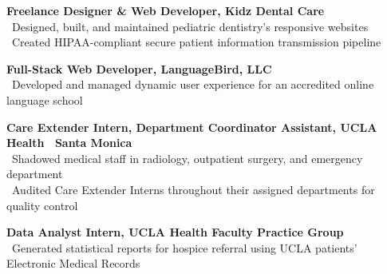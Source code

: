 \textbf{Freelance Designer \& Web Developer, Kidz Dental Care}\\
\textendash\ Designed, built, and maintained pediatric dentistry's responsive websites\\
\textendash\ Created HIPAA-compliant secure patient information transmission pipeline

\pubspace

\textbf{Full-Stack Web Developer, LanguageBird\textsuperscript{\textregistered}, LLC}\\
\textendash\ Developed and managed dynamic user experience for an accredited online language school

\pubspace

\textbf{Care Extender Intern, Department Coordinator Assistant, UCLA Health \textendash\ Santa Monica}\\
\textendash\ Shadowed medical staff in radiology, outpatient surgery, and emergency department\\
\textendash\ Audited Care Extender Interns throughout their assigned departments for quality control

\pubspace

\textbf{Data Analyst Intern, UCLA Health Faculty Practice Group}\\
\textendash\ Generated statistical reports for hospice referral using UCLA patients' Electronic Medical Records